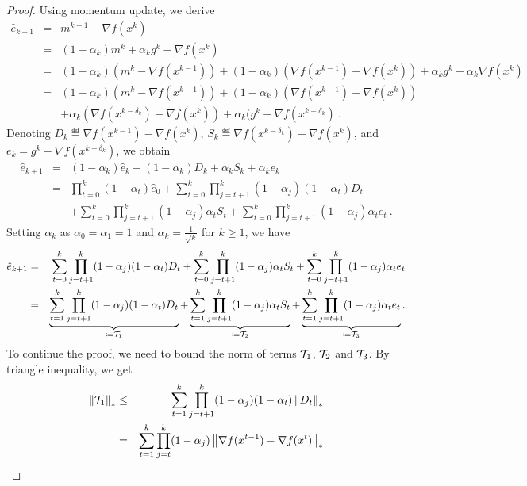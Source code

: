 \documentclass{article}
\begin{document}
\begin{proof}
Using momentum update, we derive
\begin{eqnarray*}
    \hat{e}_{k+1}
    &=& m^{k+1} - \nabla f(x^k) \\
    &=& (1-\alpha_k)m^k +\alpha_k g^k - \nabla f(x^k) \\
    &=& (1-\alpha_k)(m^k- \nabla f(x^{k-1})) + (1-\alpha_k)(\nabla f(x^{k-1}) - \nabla f(x^k)) +\alpha_k g^k - \alpha_k\nabla f(x^k) \\
    &=& (1-\alpha_k)(m^k- \nabla f(x^{k-1})) + (1-\alpha_k)(\nabla f(x^{k-1}) - \nabla f(x^k)) \\
    && +\alpha_k (\nabla f(x^{k-\delta_k}) - \nabla f(x^k))  +\alpha_k(g^k - \nabla f(x^{k-\delta_k}) ~.
\end{eqnarray*}
% 
Denoting $D_k \eqdef   \nabla f(x^{k-1}) - \nabla f(x^k)$, $S_k \eqdef \nabla f(x^{k-\delta_k}) - \nabla f(x^k)$, and $e_k = g^k - \nabla f(x^{k-\delta_k})$, we obtain
\begin{eqnarray*}
    \hat{e}_{k+1}
    &=& (1-\alpha_k) \hat{e}_{k} + (1-\alpha_k) D_k + \alpha_k S_k +\alpha_k e_k \\
    &=&\prod_{t = 0}^{k}(1-\alpha_t) \hat{e}_{0} + \sum_{t=0}^k \prod_{j=t+1}^{k}(1-\alpha_j)(1-\alpha_t) D_t \\
    && + \sum_{t=0}^k \prod_{j=t+1}^{k}(1-\alpha_j) \alpha_t S_t + \sum_{t=0}^k \prod_{j=t+1}^{k}(1-\alpha_j) \alpha_t e_t ~.
\end{eqnarray*}
Setting $\alpha_k$ as $\alpha_0 = \alpha_1 =1$ and $\alpha_k = \frac{1}{\sqrt{k}}$ for $k \ge 1$, we have
% 
\begin{eqnarray*}
    \hat{e}_{k+1} &=& \sum_{t=0}^k \prod_{j=t+1}^{k}(1-\alpha_j)(1-\alpha_t) D_t  + \sum_{t=0}^k \prod_{j=t+1}^{k}(1-\alpha_j) \alpha_t S_t + \sum_{t=0}^k \prod_{j=t+1}^{k}(1-\alpha_j) \alpha_t e_t\\
    &=& \underbrace{\sum_{t=1}^k \prod_{j=t+1}^{k}(1-\alpha_j)(1-\alpha_t) D_t}_{\coloneqq\mathcal{T}_1} + \underbrace{\sum_{t=1}^k \prod_{j=t+1}^{k}(1-\alpha_j) \alpha_t S_t}_{\coloneqq \mathcal{T}_2} + \underbrace{\sum_{t=1}^k \prod_{j=t+1}^{k}(1-\alpha_j) \alpha_t e_t}_{\coloneqq \mathcal{T}_3}.
\end{eqnarray*}
% 
To continue the proof, we need to bound the norm of terms $\mathcal{T}_1$, $\mathcal{T}_2$ and $\mathcal{T}_3$. By triangle inequality, we get 
\begin{eqnarray*}
    \norm{\cT_1}_* &\le& \sum_{t=1}^k \prod_{j=t+1}^{k}(1-\alpha_j)(1-\alpha_t) \norm{D_t}_*\\
    &=& \sum_{t=1}^k \prod_{j=t}^{k}(1-\alpha_j) \norm{ \nabla f(x^{t-1}) - \nabla f(x^t)}_*\\

\end{eqnarray*}
\end{proof}
\end{document}
